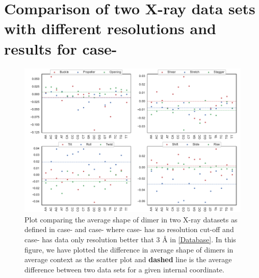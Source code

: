 \section{Comparison of two X-ray data sets with different resolutions and results for case-} 
\begin{figure}
	\begin{center}
	\includegraphics[scale=0.8]{./Xray_images/muDX2-muDX3_diff_compare_res.pdf}
	\caption{Plot comparing the average shape of dimer in two X-ray datasets as defined in case- and case- where case- has no resolution cut-off and case- has data only resolution better that 3 \AA \; in \cref{Database}. In this figure, we have plotted the difference in average shape of dimers in average context as the scatter plot and \textbf{dashed} line is the average difference between two data sets for a given internal coordinate.}
\label{SIfig:dimer_diff_res_compare}
\end{center}
\end{figure}

